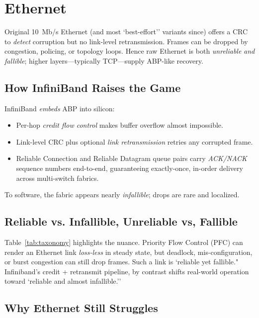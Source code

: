 \section{Ethernet}

Original 10~Mb/s Ethernet (and most `best-effort'' variants since) offers a
CRC to \emph{detect} corruption but no link-level
retransmission. Frames can be dropped by congestion, policing, or topology
loops. Hence raw Ethernet is both \emph{unreliable} \emph{and} \emph{fallible};
higher layers---typically TCP---supply ABP-like recovery.

\subsection{How InfiniBand Raises the Game}

InfiniBand \emph{embeds} ABP into silicon:

\begin{itemize}
\item Per-hop \emph{credit flow control} makes buffer overflow almost
      impossible.
\item Link-level CRC plus optional \emph{link retransmission} retries any
      corrupted frame.
\item Reliable Connection and Reliable Datagram queue pairs carry
      \emph{ACK/NACK} sequence numbers end-to-end, guaranteeing exactly-once,
      in-order delivery across multi-switch fabrics.
\end{itemize}

To software, the fabric appears nearly \emph{infallible}; drops are rare and localized.

\subsection{Reliable vs. Infallible, Unreliable vs, Fallible}

Table~\ref{tab:taxonomy} highlights the nuance.  Priority Flow Control (PFC)
can render an Ethernet link \emph{loss-less} in steady state, but deadlock,
mis-configuration, or burst congestion can still drop frames.  Such a link is
`reliable yet fallible." Infiniband's credit + retransmit pipeline, by contrast
shifts real-world operation toward `reliable and almost infallible.''

\subsection{Why Ethernet Still Struggles}

